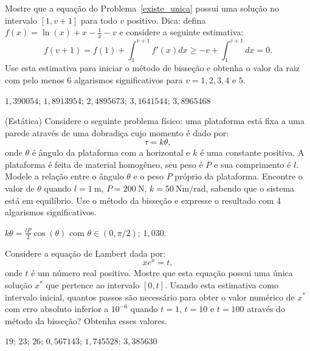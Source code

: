 \begin{exer} Mostre que a equação do Problema~\ref{existe_unica} possui uma solução no intervalo $[1, v+1]$ para todo $v$ positivo. Dica: defina $f(x)=\ln(x)+x-\frac{1}{x}-v$  e considere a seguinte estimativa:
  \begin{equation}
    f(v+1)=f(1)+\int_1^{v+1}f'(x)dx\geq -v+\int_1^{v+1}dx=0.
  \end{equation}
Use esta estimativa para iniciar o método de bisseção e obtenha o valor da raiz com pelo menos 6 algarismos significativos para $v=1, 2, 3, 4$ e $5$.
\end{exer}
\begin{resp}
    $1,390054$; $1,8913954$; $2,4895673$; $3,1641544$; $3,8965468$
\end{resp}

\begin{exer}(Estática) Considere o seguinte problema físico: uma plataforma está fixa a uma parede através de uma dobradiça cujo momento é dado por:
  \begin{equation}
    \tau=k\theta,
  \end{equation}
onde $\theta$ é ângulo da plataforma com a horizontal e $k$ é uma constante positiva. A plataforma é feita de material homogêneo, seu peso é $P$ e sua comprimento é $l$. Modele a relação entre o ângulo $\theta$ e o peso $P$ próprio da plataforma. Encontre o valor de $\theta$ quando $l=1~\mbox{m}$, $P=200~\mbox{N}$, $k=50~\mbox{Nm}/\mbox{rad}$, sabendo que o sistema está em equilíbrio. Use o método da bisseção e expresse o resultado com 4 algarismos significativos.
\end{exer}
\begin{resp}
    $k\theta=\frac{lP}{2}\cos(\theta)$ com $\theta\in (0, \pi/2)$; $1,030$.
\end{resp}


\begin{exer} Considere a equação de Lambert dada por:
  \begin{equation}
    xe^x= t,
  \end{equation}
onde $t$ é um número real positivo. Mostre que esta equação possui uma única solução $x^*$ que pertence ao intervalo $[0, t]$. Usando esta estimativa como intervalo inicial, quantos passos são necessário para obter o valor numérico de $x^*$ com erro absoluto inferior a $10^{-6}$ quando $t=1$, $t=10$ e $t=100$ através do método da bisseção? Obtenha esses valores.
\end{exer}
\begin{resp}
    $19$; $23$; $26$; $0,567143$; $1,745528$; $3,385630$
\end{resp}

